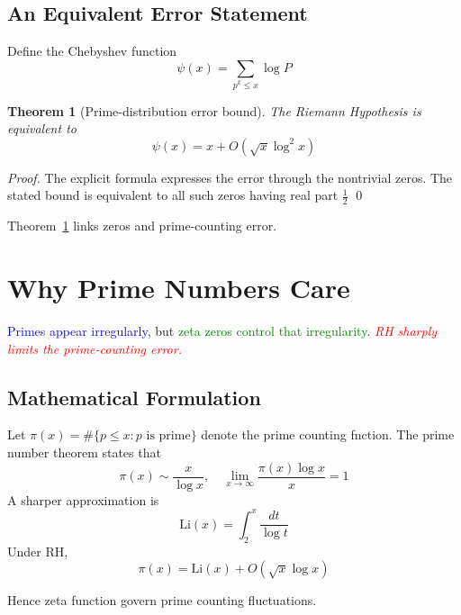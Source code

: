 \documentclass[twocolumn,10pt]{article}
\newtheorem{theorem}{Theorem}
\begin{document}
\subsection{An Equivalent Error Statement}
Define the Chebyshev function
\[
\psi(x) = \sum_{p^k \le x} \log P
\]

\begin{theorem}[Prime-distribution error bound]
The
Riemann Hypothesis is equivalent to
\begin{equation}
    \psi(x) = x + O(\sqrt{x}\log ^2 x)
\end{equation}
\label{thm:one}
\end{theorem}
\begin{proof}
    The explicit formula expresses the error through
the nontrivial zeros. The stated bound is equivalent to
all such zeros having real part $\frac{1}{2}$ \qed
\end{proof}
Theorem~\ref{thm:one} links zeros and prime-counting error.


\section{Why Prime Numbers Care}
\textcolor{blue}{Primes appear irregularly}, but \textcolor{green}{zeta zeros control that
irregularity}. \textcolor{red}{
\textit{RH sharply limits the prime-counting error.}
}

\subsection{Mathematical Formulation}
Let $\pi(x) = \#\{p \le x:p \text{ is prime} \}$ denote the prime counting fnction. The prime number theorem states that
\begin{equation}
    \pi(x) \sim \frac{x}{\log x}, \quad \lim_{x\to \infty} \frac{\pi(x)\log x}{x} = 1
\end{equation}
 A sharper approximation is 
 \begin{equation}
     \text{Li}(x) = \int_{2}^x \frac{dt}{\log t}
 \end{equation}
Under RH, 
\begin{equation}
    \pi(x) = \text{Li}(x) + O(\sqrt{x}\log x )
\end{equation}

Hence zeta function govern prime counting fluctuations.

\printbibliography
\end{document}
